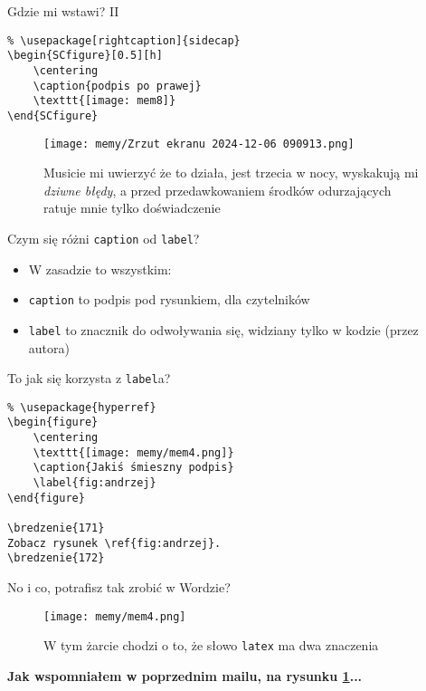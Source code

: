 \documentclass{beamer}
\begin{document}
\begin{frame}[fragile]{Gdzie mi wstawi? II}
    \begin{verbatim}
% \usepackage[rightcaption]{sidecap}
\begin{SCfigure}[0.5][h]
    \centering
    \caption{podpis po prawej}
    \texttt{[image: mem8]}
\end{SCfigure}\end{verbatim}
    \begin{figure}
        \centering
        \texttt{[image: memy/Zrzut ekranu 2024-12-06 090913.png]}
        \caption{Musicie mi uwierzyć że to działa, jest trzecia w nocy, wyskakują mi \emph{dziwne błędy}, a przed przedawkowaniem środków odurzających ratuje mnie tylko doświadczenie}
    \end{figure}
\end{frame}

\begin{frame}{Czym się różni \texttt{caption} od \texttt{label}?}{}
    \begin{itemize}[<+->]
        \item W zasadzie to wszystkim:
        \item \texttt{caption} to podpis pod rysunkiem, dla czytelników
        \item \texttt{label} to znacznik do odwoływania się, widziany tylko w kodzie (przez autora)
    \end{itemize}
\end{frame}

\begin{frame}[fragile]{To jak się korzysta z \texttt{label}a?}{}
\begin{verbatim}
% \usepackage{hyperref}
\begin{figure}
    \centering
    \texttt{[image: memy/mem4.png]}
    \caption{Jakiś śmieszny podpis}
    \label{fig:andrzej}
\end{figure}

\bredzenie{171}
Zobacz rysunek \ref{fig:andrzej}.
\bredzenie{172}
\end{verbatim}
\end{frame}

\begin{frame}{No i co, potrafisz tak zrobić w Wordzie?}
    \begin{figure}
        \centering
        \texttt{[image: memy/mem4.png]}
        \caption{W tym żarcie chodzi o to, że słowo \texttt{latex} ma dwa znaczenia}
        \label{fig:zart}
    \end{figure}
    {\tiny {} \textbf{Jak wspomniałem w poprzednim mailu, na rysunku \ref{fig:zart}...}  }
\end{frame}
\end{document}
